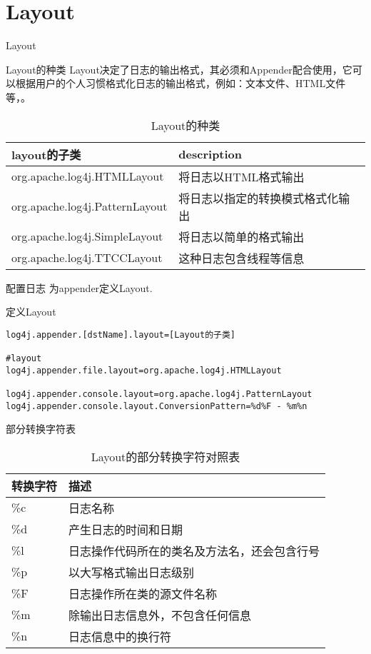 \documentclass{beamer}
\begin{document}
\section{Layout}
\begin{frame}
\Huge{\centerline{Layout}}
\end{frame}
\begin{frame}{Layout的种类}
Layout决定了日志的输出格式，其必须和Appender配合使用，它可以根据用户的个人习惯格式化日志的输出格式，例如：文本文件、HTML文件等，。
\begin{table}
\begin{tabular}{ll}
\toprule
\textbf{layout的子类}&\textbf{description}\\
\midrule
org.apache.log4j.HTMLLayout&将日志以HTML格式输出\\
org.apache.log4j.PatternLayout&将日志以指定的转换模式格式化输出\\
org.apache.log4j.SimpleLayout&将日志以简单的格式输出\\
org.apache.log4j.TTCCLayout&这种日志包含线程等信息\\
\bottomrule
\end{tabular}
\caption{Layout的种类}
\label{layout}
\end{table}
\end{frame}
\begin{frame}[fragile]{配置日志}
为appender定义Layout.
\begin{block}{定义Layout}
\begin{verbatim}
log4j.appender.[dstName].layout=[Layout的子类]

#layout
log4j.appender.file.layout=org.apache.log4j.HTMLLayout

log4j.appender.console.layout=org.apache.log4j.PatternLayout
log4j.appender.console.layout.ConversionPattern=%d%F - %m%n
\end{verbatim}
\end{block}
\end{frame}

\begin{frame}{部分转换字符表}
\begin{table}
\begin{tabular}{ll}
\toprule
\textbf{转换字符}&\textbf{描述}\\
\midrule
\%c&日志名称\\
\%d&产生日志的时间和日期\\
\%l&日志操作代码所在的类名及方法名，还会包含行号\\
\%p&以大写格式输出日志级别\\
\%F&日志操作所在类的源文件名称\\
\%m&除输出日志信息外，不包含任何信息\\
\%n&日志信息中的换行符\\
\bottomrule
\end{tabular}
\caption{Layout的部分转换字符对照表}
\end{table}
\end{frame}
\end{document}
